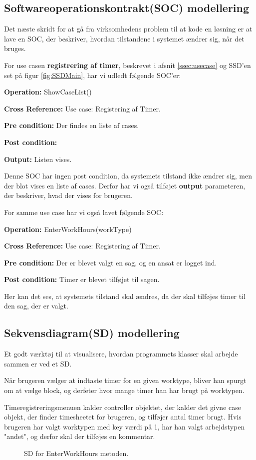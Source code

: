 \subsection{Softwareoperationskontrakt(SOC) modellering}

Det næste skridt for at gå fra virksomhedens problem til at kode en løsning er at lave en SOC, der beskriver, hvordan tilstandene i systemet ændrer sig, når det bruges.

For use casen \textbf{registrering af timer}, beskrevet i afsnit \ref{ssec:usecase} og SSD'en set på figur \ref{fig:SSDMain}, har vi udledt følgende SOC'er:

\textbf{Operation:} ShowCaseList()

\textbf{Cross Reference:} Use case: Registering af Timer.

\textbf{Pre condition:} Der findes en liste af cases.

\textbf{Post condition:}

\textbf{Output:} Listen vises.

Denne SOC har ingen post condition, da systemets tilstand ikke ændrer sig, men der blot vises en liste af cases.
Derfor har vi også tilføjet \textbf{output} parameteren, der beskriver, hvad der vises for brugeren.

For samme use case har vi også lavet følgende SOC:

\textbf{Operation:} EnterWorkHours(workType)

\textbf{Cross Reference:} Use case: Registering af Timer.

\textbf{Pre condition:} Der er blevet valgt en sag, og en ansat er logget ind.

\textbf{Post condition:} Timer er blevet tilføjet til sagen.

Her kan det ses, at systemets tilstand skal ændres, da der skal tilføjes timer til den sag, der er valgt.

\subsection{Sekvensdiagram(SD) modellering}

Et godt værktøj til at visualisere, hvordan programmets klasser skal arbejde sammen er ved et SD.

Når brugeren vælger at indtaste timer for en given worktype, bliver han spurgt om at vælge block, og derfeter hvor mange timer han har brugt på worktypen.

Timeregistreringsmenuen kalder controller objektet, der kalder det givne case objekt, der finder timesheetet for brugeren, og tilføjer antal timer brugt.
Hvis brugeren har valgt worktypen med key værdi på 1, har han valgt arbejdstypen "andet", og derfor skal der tilføjes en kommentar.
\begin{figure}[H]
    \caption{SD for EnterWorkHours metoden.}
    \label{fig:SDEnterWorkHours}
\end{figure}

